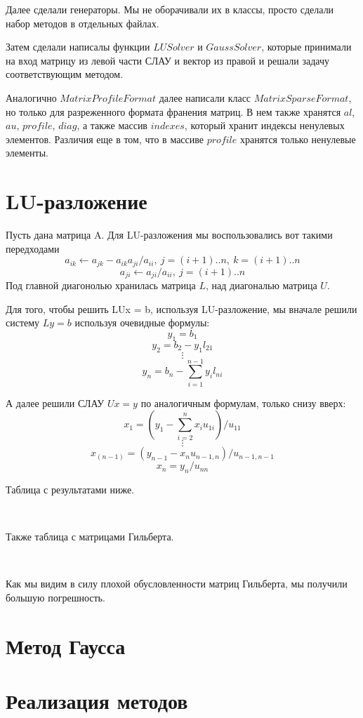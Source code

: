 Далее сделали генераторы. Мы не оборачивали их в классы, просто сделали набор методов в отдельных файлах.

Затем сделали написалы функции $LUSolver$ и $GaussSolver$, которые принимали на вход 
матрицу из левой части СЛАУ и вектор из правой и решали задачу соответствующим методом.

Аналогично $MatrixProfileFormat$ далее написали класс $MatrixSparseFormat$, но только для разреженного формата
франения матриц. В нем также хранятся $al$, $au$, $profile$, $diag$, а также массив $indexes$, 
который хранит индексы ненулевых элементов. Различия еще в том, что 
в массиве $profile$ хранятся только ненулевые элементы.

\newpage
\section{LU-разложение}

Пусть дана матрица A. Для LU-разложения мы воспользовались вот такими передходами
$$a_{ik} \leftarrow a_{jk} - a_{ik}a_{ji}/a_{ii}, \ j = (i + 1)..n, \ k = (i + 1)..n$$
$$a_{ji} \leftarrow a_{ji}/a_{ii}, \ j = (i + 1)..n$$
Под главной диагонолью хранилась матрица $L$, над диагональю матрица $U$.

Для того, чтобы решить LUx = b, используя LU-разложение, мы вначале решили систему $Ly = b$
используя очевидные формулы:
$$y_1 = b_1$$
$$y_2 = b_2 - y_1l_{21}$$
$$\vdots$$
$$y_n = b_n - \sum_{i = 1}^{n - 1}y_il_{ni}$$


А далее решили СЛАУ $Ux = y$ по аналогичным формулам, только снизу вверх:
$$x_1 = (y_1 - \sum_{i = 2}^{n}x_iu_{1i})/u_{11}$$
$$\vdots$$
$$x_(n - 1) = (y_{n - 1} - x_nu_{n - 1, n})/u_{n - 1, n - 1}$$
$$x_n = y_n/u_{nn}$$

Таблица с результатами ниже.



\

Также таблица с матрицами Гильберта.

\


Как мы видим в силу плохой обусловленности матриц Гильберта, мы получили большую погрешность.


\newpage
\section{Метод Гаусса}


\newpage
\section{Реализация методов}
